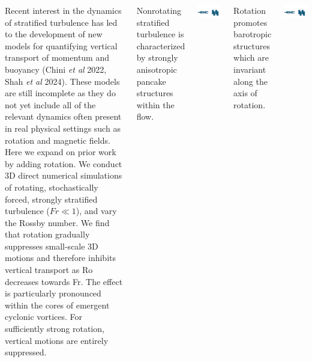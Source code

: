 \documentclass[30pt, blockverticalspace=1cm]{tikzposter}
\begin{document}
\begin{columns}




{
Recent interest in the dynamics of stratified turbulence has led to the
development of new models for quantifying vertical transport of momentum and
buoyancy (Chini {\em et al} 2022, Shah {\em et al} 2024). These models are still
incomplete as they do not yet include all of the relevant dynamics often present
in real physical settings such as rotation and magnetic fields. Here we expand
on prior work by adding rotation. We conduct 3D direct numerical simulations of
rotating, stochastically forced, strongly stratified turbulence ($Fr \ll  1$), and vary the Rossby number. We find that rotation gradually suppresses small-scale 3D motions and therefore inhibits vertical transport as Ro decreases towards Fr. The effect is particularly pronounced within the cores of emergent cyclonic vortices. For sufficiently strong rotation, vertical motions are entirely suppressed.
}


{ 
    
    Nonrotating stratified turbulence is characterized by strongly
    anisotropic pancake structures within the flow. 

    \includegraphics[width=.9\linewidth]{images/pancakes.pdf}
\emp
\hfill
{}
    
    Rotation promotes barotropic structures which are invariant along the axis
    of rotation.

    \includegraphics[width=.9\linewidth]{images/cylinders.pdf}
\emp
}



\end{columns}
\end{document}
